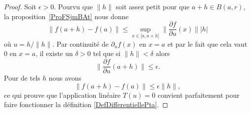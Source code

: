 \begin{proof}
	Soit \( \epsilon>0\). Pourvu que \( \| h \|\) soit assez petit pour que \( a+h\in B(a,r)\), la proposition~\ref{ProFSjmBAt} nous donne
	\begin{equation}
		\| f(a+h)-f(a) \|\leq \sup_{x\in\mathopen[ a , a+h \mathclose]}\| \frac{ \partial f }{ \partial u }(x) \|  |h |
	\end{equation}
	où \( u=h/\| h \|\). Par continuité de \( \partial_uf(x)\) en \( x=a\) et par le fait que cela vaut \( 0\) en \( x=a\), il existe un \( \delta>0\) tel que si \( \| h \|<\delta\) alors
	\begin{equation}
		\| \frac{ \partial f }{ \partial u }(a+h) \|\leq \epsilon.
	\end{equation}
	Pour de tels \( h\) nous avons
	\begin{equation}
		\| f(a+h)-f(a) \|\leq \epsilon\| h \|,
	\end{equation}
	ce qui prouve que l'application linéaire \( T(u)=0\) convient parfaitement pour faire fonctionner la définition \ref{DefDifferentiellePta}.

\end{proof}
